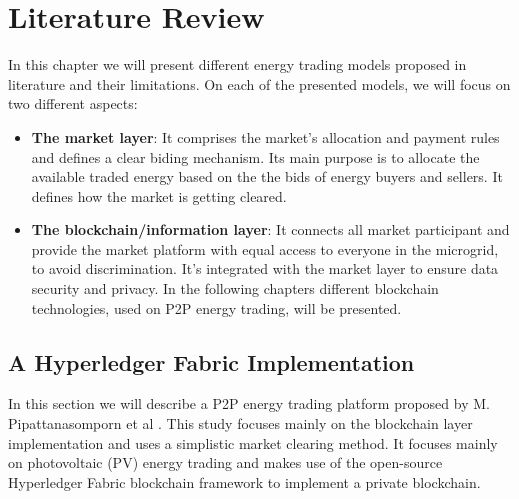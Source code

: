 \chapter{Literature Review} \label{literature}
\label{chapter3}
In this chapter we will present different energy trading models proposed in literature
and their limitations. On each of the presented models, we will focus on two different
aspects:
\begin{itemize}
    \item \textbf{The market layer}: It comprises the market's allocation and payment rules and defines
          a clear biding mechanism. Its main purpose is to allocate the available traded energy based on the
          the bids of energy buyers and sellers. It defines how the market is getting cleared.
    \item \textbf{The blockchain/information layer}: It connects all market participant and provide the market platform with equal
          access to everyone in the microgrid, to avoid discrimination. It's integrated with the market layer to ensure
          data security and privacy. In the following chapters different blockchain technologies, used on P2P energy trading, will
          be presented. \cite{DeTrade,BrooklynMicrogrid}
\end{itemize}


\section{A Hyperledger Fabric Implementation}
\label{sec:hfi}
In this section we will describe a P2P energy trading platform proposed by M. Pipattanasomporn et al \cite{Pipattanasomporn2013}.
This study focuses mainly on the blockchain layer implementation and uses a simplistic market clearing method.
It focuses mainly on photovoltaic (PV) energy trading and makes use of the open-source Hyperledger Fabric blockchain framework
to implement a private blockchain.
